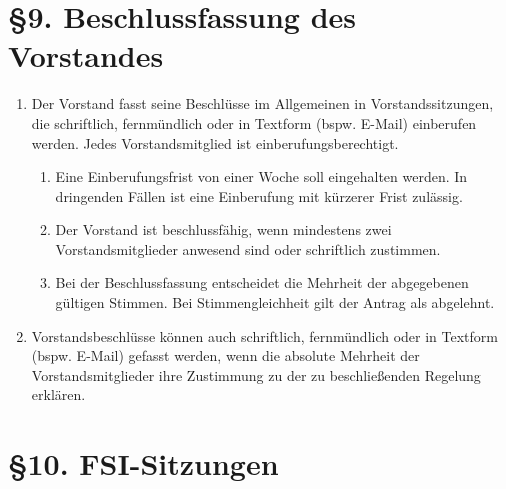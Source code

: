 \documentclass[a4paper,12pt]{article}
\begin{document}
\section*{§9. Beschlussfassung des Vorstandes}

\begin{enumerate}
    	\item
		Der Vorstand fasst seine Beschlüsse im Allgemeinen in
		Vorstandssitzungen, die schriftlich, fernmündlich oder in
		Textform (bspw. E-Mail) einberufen werden. Jedes
		Vorstandsmitglied ist einberufungsberechtigt.
    		\begin{enumerate}[label=(\roman*)]
			\item
				Eine Einberufungsfrist von einer Woche soll
				eingehalten werden. In dringenden Fällen ist
				eine Einberufung mit kürzerer Frist zulässig.
			\item
				Der Vorstand ist beschlussfähig, wenn
				mindestens zwei Vorstandsmitglieder anwesend
				sind oder schriftlich zustimmen.
			\item
				Bei der Beschlussfassung entscheidet die
				Mehrheit der abgegebenen gültigen Stimmen. Bei
				Stimmengleichheit gilt der Antrag als abgelehnt.
    		\end{enumerate}
	\item
		Vorstandsbeschlüsse können auch schriftlich, fernmündlich oder
		in Textform (bspw. E-Mail) gefasst werden, wenn die absolute
		Mehrheit der Vorstandsmitglieder ihre Zustimmung zu der zu
		beschließenden Regelung erklären.
\end{enumerate}

\section*{§10. FSI-Sitzungen}
\end{document}
